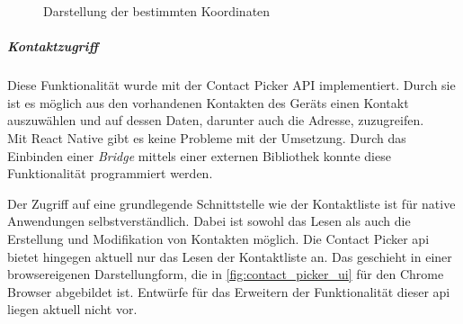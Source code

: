 \begin{figure}[h]
\caption{Darstellung der bestimmten Koordinaten}
\label{fig:comparison_geoloc}
\end{figure}

\subparagraph{Kontaktzugriff\\}
Diese Funktionalität wurde mit der Contact Picker API implementiert.
Durch sie ist es möglich aus den vorhandenen Kontakten des Geräts einen Kontakt auszuwählen und auf dessen Daten, darunter auch die Adresse, zuzugreifen.\\
Mit React Native gibt es keine Probleme mit der Umsetzung.
Durch das Einbinden einer \textit{Bridge} mittels einer externen Bibliothek konnte diese Funktionalität programmiert werden.

Der Zugriff auf eine grundlegende Schnittstelle wie der Kontaktliste ist für native Anwendungen selbstverständlich.
Dabei ist sowohl das Lesen als auch die Erstellung und Modifikation von Kontakten möglich.
Die Contact Picker \ac{api} bietet hingegen aktuell nur das Lesen der Kontaktliste an.
Das geschieht in einer browsereigenen Darstellungform, die in \ref{fig:contact_picker_ui} für den Chrome Browser abgebildet ist.
Entwürfe für das Erweitern der Funktionalität dieser \ac{api} liegen aktuell nicht vor.

